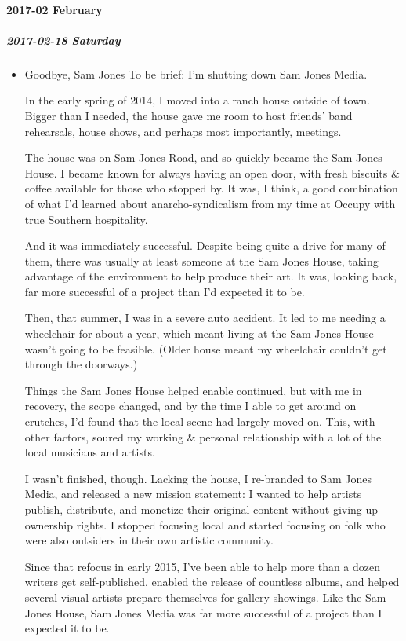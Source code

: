 \documentclass[11pt]{article}
\begin{document}
\paragraph*{2017-02 February}
\label{sec:org2183cb1}
\startcontents[level-4]
\subparagraph*{2017-02-18 Saturday}
\label{sec:orgd7b998d}
\begin{itemize}
\item Goodbye, Sam Jones
\label{sec:org3626463}
To be brief: I'm shutting down Sam Jones Media.

In the early spring of 2014, I moved into a ranch house outside of town. Bigger than I needed, the house gave me room to host friends’ band rehearsals, house shows, and perhaps most importantly, meetings.

The house was on Sam Jones Road, and so quickly became the Sam Jones House. I became known for always having an open door, with fresh biscuits \& coffee available for those who stopped by. It was, I think, a good combination of what I’d learned about anarcho-syndicalism from my time at Occupy with true Southern hospitality.

And it was immediately successful. Despite being quite a drive for many of them, there was usually at least someone at the Sam Jones House, taking advantage of the environment to help produce their art. It was, looking back, far more successful of a project than I’d expected it to be.

Then, that summer, I was in a severe auto accident. It led to me needing a wheelchair for about a year, which meant living at the Sam Jones House wasn’t going to be feasible. (Older house meant my wheelchair couldn’t get through the doorways.)

Things the Sam Jones House helped enable continued, but with me in recovery, the scope changed, and by the time I able to get around on crutches, I’d found that the local scene had largely moved on. This, with other factors, soured my working \& personal relationship with a lot of the local musicians and artists.

I wasn’t finished, though. Lacking the house, I re-branded to Sam Jones Media, and released a new mission statement: I wanted to help artists publish, distribute, and monetize their original content without giving up ownership rights. I stopped focusing local and started focusing on folk who were also outsiders in their own artistic community.

Since that refocus in early 2015, I’ve been able to help more than a dozen writers get self-published, enabled the release of countless albums, and helped several visual artists prepare themselves for gallery showings. Like the Sam Jones House, Sam Jones Media was far more successful of a project than I expected it to be.


\end{itemize}
\end{document}
